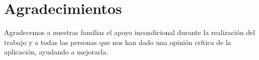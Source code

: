 \newpage
\chapter*{Agradecimientos}
\noindent

Agradecemos a nuestras familias el apoyo incondicional durante la realización del trabajo y a todas las personas que nos han dado una opinión crítica de la aplicación, ayudando a mejorarla.